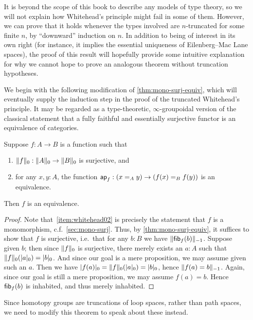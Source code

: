 It is beyond the scope of this book to describe any models of type theory, so we will not explain how Whitehead's principle might fail in some of them.
However, we can prove that it holds whenever the types involved are $n$-truncated for some finite $n$, by ``downward'' induction on $n$.
In addition to being of interest in its own right (for instance, it implies the essential uniqueness of Eilenberg--Mac Lane spaces), the proof of this result will hopefully provide some intuitive explanation for why we cannot hope to prove an analogous theorem without truncation hypotheses.

We begin with the following modification of \autoref{thm:mono-surj-equiv}, which will eventually supply the induction step in the proof of the truncated Whitehead's principle.
It may be regarded as a type-theoretic, $\infty$-groupoidal version of the classical statement that a fully faithful and essentially surjective functor is an equivalence of categories.

\begin{thm}\label{thm:whitehead0}
  Suppose $f:A\to B$ is a function such that
  \begin{enumerate}
  \item $\trunc0 f : \trunc0 A \to \trunc0 B$ is surjective, and\label{item:whitehead01}
  \item for any $x,y:A$, the function $\apfunc f : (\id[A]xy) \to (\id[B]{f(x)}{f(y)})$ is an equivalence.\label{item:whitehead02}
  \end{enumerate}
  Then $f$ is an equivalence.
\end{thm}
\begin{proof}
  Note that~\ref{item:whitehead02} is precisely the statement that $f$ is a monomorphism, c.f.~\autoref{sec:mono-surj}.
  Thus, by \autoref{thm:mono-surj-equiv}, it suffices to show that $f$ is surjective, i.e.\ that for any $b:B$ we have $\trunc{-1}{\hfib f b}$.
  Suppose given $b$; then since $\trunc0 f$ is surjective, there merely exists an $a:A$ such that $\trunc 0 f(\tproj0a) = \tproj0b$.
  And since our goal is a mere proposition, we may assume given such an $a$.
  Then we have $\tproj0{f(a)} = \trunc 0 f(\tproj0a) =\tproj0b$, hence $\trunc{-1}{f(a)=b}$.
  Again, since our goal is still a mere proposition, we may assume $f(a)=b$.
  Hence $\hfib f b$ is inhabited, and thus merely inhabited.
\end{proof}

Since homotopy groups are truncations of loop spaces, rather than path spaces, we need to modify this theorem to speak about these instead.

